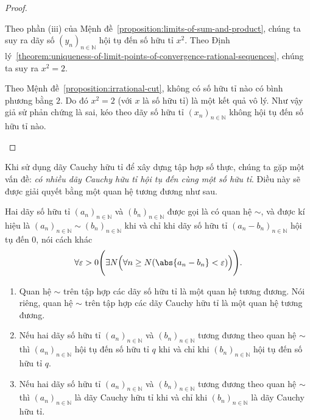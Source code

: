 \begin{proof}
\begin{enumerate}[label={\textbf{Bước \arabic*.}},itemindent=1cm]
              Theo phần (iii) của Mệnh đề~\ref{proposition:limits-of-sum-and-product}, chúng ta suy ra dãy số ${(y_{n})}_{n\in\mathbb{N}}$ hội tụ đến số hữu tỉ $x^{2}$. Theo Định lý~\ref{theorem:uniqueness-of-limit-points-of-convergence-rational-sequences}, chúng ta suy ra $x^{2} = 2$.

              Theo Mệnh đề~\ref{proposition:irrational-cut}, không có số hữu tỉ nào có bình phương bằng $2$. Do đó $x^{2} = 2$ (với $x$ là số hữu tỉ) là một kết quả vô lý. Như vậy giả sử phản chứng là sai, kéo theo dãy số hữu tỉ ${(x_{n})}_{n\in\mathbb{N}}$ không hội tụ đến số hữu tỉ nào.
    \end{enumerate}
\end{proof}

Khi sử dụng dãy Cauchy hữu tỉ để xây dựng tập hợp số thực, chúng ta gặp một vấn đề: \textit{có nhiều dãy Cauchy hữu tỉ hội tụ đến cùng một số hữu tỉ}. Điều này sẽ được giải quyết bằng một quan hệ tương đương như sau.

\begin{theorem}\label{theorem:equivalent-rational-sequences}
    Hai dãy số hữu tỉ ${(a_{n})}_{n\in\mathbb{N}}$ và ${(b_{n})}_{n\in\mathbb{N}}$ được gọi là có quan hệ $\sim$, và được kí hiệu là ${(a_{n})}_{n\in\mathbb{N}} \sim {(b_{n})}_{n\in\mathbb{N}}$ khi và chỉ khi dãy số hữu tỉ ${(a_{n} - b_{n})}_{n\in\mathbb{N}}$ hội tụ đến $0$, nói cách khác
    \[
        \forall\varepsilon > 0\Biggl( \exists N \Bigl( \forall n\geq N ( \abs{a_{n} - b_{n}} < \varepsilon ) \Bigr) \Biggr).
    \]
    \begin{enumerate}[label={(\roman*)},itemsep=0pt]
        \item Quan hệ $\sim$ trên tập hợp các dãy số hữu tỉ là một quan hệ tương đương. Nói riêng, quan hệ $\sim$ trên tập hợp các dãy Cauchy hữu tỉ là một quan hệ tương đương.
        \item Nếu hai dãy số hữu tỉ ${(a_{n})}_{n\in\mathbb{N}}$ và ${(b_{n})}_{n\in\mathbb{N}}$ tương đương theo quan hệ $\sim$ thì ${(a_{n})}_{n\in\mathbb{N}}$ hội tụ đến số hữu tỉ $q$ khi và chỉ khi ${(b_{n})}_{n\in\mathbb{N}}$ hội tụ đến số hữu tỉ $q$.
        \item Nếu hai dãy số hữu tỉ ${(a_{n})}_{n\in\mathbb{N}}$ và ${(b_{n})}_{n\in\mathbb{N}}$ tương đương theo quan hệ $\sim$ thì ${(a_{n})}_{n\in\mathbb{N}}$ là dãy Cauchy hữu tỉ khi và chỉ khi ${(b_{n})}_{n\in\mathbb{N}}$ là dãy Cauchy hữu tỉ.
    \end{enumerate}
\end{theorem}

